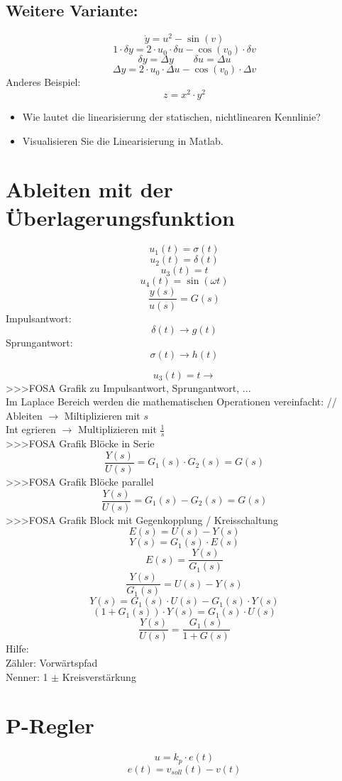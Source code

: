 \subsection{Weitere Variante: }
\[ \dot{y} = u^2 - \sin(v) \]
\[ 1 \cdot \delta y = 2 \cdot u_0 \cdot \delta u - \cos(v_0) \cdot \delta v \]
\[ \delta y = \Delta y \qquad \delta u = \Delta u \]
\[ \Delta y = 2 \cdot u_0 \cdot \Delta u - \cos(v_0) \cdot \Delta v \]
Anderes Beispiel: 
\[ z = x^2 \cdot y^2 \]
\begin{itemize}
  \item Wie lautet die linearisierung der statischen, nichtlinearen Kennlinie? 
  \item Visualisieren Sie die Linearisierung in Matlab. 
\end{itemize}

\section{Ableiten mit der Überlagerungsfunktion}
\[ u_1(t) = \sigma(t) \]
\[ u_2(t) = \delta(t) \]
\[ u_3(t) = t \]
\[ u_4(t) = \sin(\omega t) \]
\[ \frac{y(s)}{u(s)} = G(s) \]
Impulsantwort: 
\[ \delta(t) \to g(t) \]
Sprungantwort: 
\[ \sigma(t) \to h(t) \]

\[ u_3(t) = t \to  \]
>>>FOSA Grafik zu Impulsantwort, Sprungantwort, ...\\
Im Laplace Bereich werden die mathematischen Operationen vereinfacht: //
Ableiten $\to$ Miltiplizieren mit $s$\\
Int egrieren $\to$ Multiplizieren mit $\frac{1}{s}$\\
>>>FOSA Grafik Blöcke in Serie\\
\[ \frac{Y(s)}{U(s)} = G_1(s) \cdot G_2(s) = G(s) \]
>>>FOSA Grafik Blöcke parallel\\
\[ \frac{Y(s)}{U(s)} = G_1(s) - G_2(s) = G(s) \]
>>>FOSA Grafik Block mit Gegenkopplung / Kreisschaltung\\
\[ E(s) = U(s) - Y(s) \]
\[ Y(s) = G_1(s) \cdot E(s) \]
\[ E(s) = \frac{Y(s)}{G_1(s)} \]
\[ \frac{Y(s)}{G_1(s)} = U(s) - Y(s) \]
\[ Y(s) = G_1(s) \cdot U(s) - G_1(s) \cdot Y(s) \]
\[ (1 + G_1(s)) \cdot Y(s) = G_1(s) \cdot U(s) \]
\[ \frac{Y(s)}{U(s)} = \frac{G_1(s)}{1 + G(s)} \]
Hilfe: \\
Zähler: Vorwärtspfad\\
Nenner: 1 $\pm$ Kreisverstärkung

\section{P-Regler}
\[ u = k_p \cdot e(t) \]
\[ e(t) = v_{soll}(t) - v(t) \]

